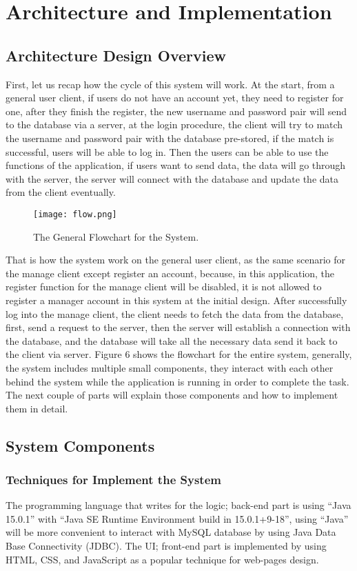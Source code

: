 \documentclass[12pt]{article}
\begin{document}
\section{Architecture and Implementation}
\subsection{Architecture Design Overview}
First, let us recap how the cycle of this system will work. At the start, from a general user client, if users do not have an account yet, they need to register for one, after they finish the register, the new username and password pair will send to the database via a server, at the login procedure, the client will try to match the username and password pair with the database pre-stored, if the match is successful, users will be able to log in. Then the users can be able to use the functions of the application, if users want to send data, the data will go through with the server, the server will connect with the database and update the data from the client eventually. 
\begin{figure}[ht]
\centering
\texttt{[image: flow.png]}
\caption{The General Flowchart for the System.}
\label{fig:label}
\end{figure}
That is how the system work on the general user client, as the same scenario for the manage client except register an account, because, in this application, the register function for the manage client will be disabled, it is not allowed to register a manager account in this system at the initial design. After successfully log into the manage client, the client needs to fetch the data from the database, first, send a request to the server, then the server will establish a connection with the database, and the database will take all the necessary data send it back to the client via server. Figure 6 shows the flowchart for the entire system, generally, the system includes multiple small components, they interact with each other behind the system while the application is running in order to complete the task. The next couple of parts will explain those components and how to implement them in detail.
\subsection{System Components}
\subsubsection{Techniques for Implement the System}
The programming language that writes for the logic; back-end part is using ``Java 15.0.1'' with ``Java SE Runtime Environment build in 15.0.1+9-18'', using ``Java'' will be more convenient to interact with MySQL database by using Java Data Base Connectivity (JDBC). The UI; front-end part is implemented by using HTML, CSS, and JavaScript as a popular technique for web-pages design.
\end{document}

